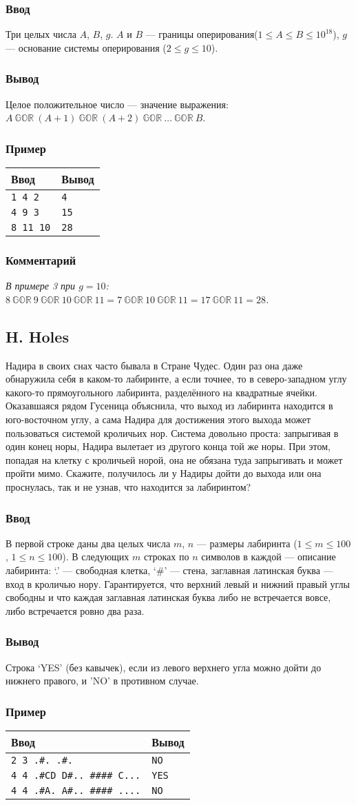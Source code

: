 \documentclass[10pt, a4paper]{article}
\newcommand{\informat}[1]
{
	\subsubsection*{Ввод} #1
}
\newcommand{\outformat}[1]
{
	\subsubsection*{Вывод} #1
}
\newcommand{\exampleee}[6]
{
	\subsubsection*{Пример}
	\noindent
	\begin{center}
	\begin{tabularx}{\linewidth}{|X|X|}
	\hline
	Ввод 	& Вывод  	\\
	\hline
	{\tt #1} & {\tt #2}	\\
	\hline
	{\tt #3} & {\tt #4}	\\
	\hline
	{\tt #5} & {\tt #6}	\\
	\hline
	\end{tabularx}
	\end{center}
}
\newcommand{\excomm}[1]
{
	\subsubsection*{Комментарий}
	\textit{#1}
}
\begin{document}
\informat{Три целых числа $A$, $B$, $g$. $A$ и $B$ --- границы оперирования($1 \le A \le B \le 10^{18}$), $g$ --- основание системы оперирования ($2 \le g \le 10$).}

\outformat{Целое положительное число --- значение выражения: \newline $A \ \mathbb{GOR} \ (A+1) \ \mathbb{GOR} \ (A+2) \ \mathbb{GOR} \ \dots \ \mathbb{GOR} \ B$.}

\exampleee{1 4 2}{4}{4 9 3}{15}{8 11 10}{28}

\excomm{В примере 3 при $g = 10$: \newline
$8 \ \mathbb{GOR} \ 9 \ \mathbb{GOR} \ 10 \ \mathbb{GOR} \ 11 = 7 \ \mathbb{GOR} \ 10 \ \mathbb{GOR} \ 11 = 17 \ \mathbb{GOR} \ 11 = 28$.}



\subsection*{H. Holes}

Надира в своих снах часто бывала в Стране Чудес. Один раз она даже обнаружила себя в каком-то лабиринте, а если точнее, то в северо-западном углу какого-то прямоугольного лабиринта, разделённого на квадратные ячейки. Оказавшаяся рядом Гусеница объяснила, что выход из лабиринта находится в юго-восточном углу, а сама Надира для достижения этого выхода может пользоваться системой кроличьих нор. Система довольно проста: запрыгивая в один конец норы, Надира вылетает из другого конца той же норы. При этом, попадая на клетку с кроличьей норой, она не обязана туда запрыгивать и может пройти мимо. Скажите, получилось ли у Надиры дойти до выхода или она проснулась, так и не узнав, что находится за лабиринтом?

\informat{В первой строке даны два целых числа $m$, $n$ --- размеры лабиринта ($1 \le m \le 100$, $1 \le n \le 100$). В следующих $m$ строках по $n$ символов в каждой --- описание лабиринта: ‘.’ --- свободная клетка, ‘\#’ --- стена, заглавная латинская буква --- вход в кроличью нору. Гарантируется, что верхний левый и нижний правый углы свободны и что каждая заглавная латинская буква либо не встречается вовсе, либо встречается ровно два раза.}

\outformat{Строка ‘YES’ (без кавычек), если из левого верхнего угла можно дойти до нижнего правого, и ’NO’ в противном случае.}

\exampleee%
{2 3 \newline
.\#.\newline
.\#.}%
{NO}%
{4 4 \newline
.\#CD \newline
D\#.. \newline
\#\#\#\# \newline
C...}%
{YES}%
{4 4%
.\#A. \newline
A\#.. \newline
\#\#\#\# \newline
....}%
{NO}
\end{document}
